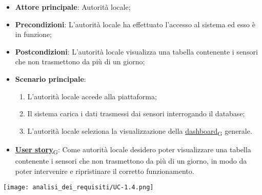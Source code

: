 \begin{itemize}
	\item \textbf{Attore principale}: Autorità locale;
	\item \textbf{Precondizioni}: L'autorità locale ha effettuato l'accesso al sistema ed esso è in funzione;
	\item \textbf{Postcondizioni}: L'autorità locale visualizza una tabella contenente i sensori che non trasmettono da più di un giorno;
	\item \textbf{Scenario principale}:
	      \begin{enumerate}
		      \item L'autorità locale accede alla piattaforma;
		      \item Il sistema carica i dati trasmessi dai sensori interrogando il database;
		      \item L'autorità locale seleziona la visualizzazione della \href{https://7last.github.io/docs/rtb/documentazione-interna/glossario\#dashboard}{dashboard\textsubscript{G}} generale.
	      \end{enumerate}
	\item \href{https://7last.github.io/docs/rtb/documentazione-interna/glossario\#user-story}{\textbf{User story}\textsubscript{G}}:
	      Come autorità locale desidero poter visualizzare una tabella contenente i sensori che non trasmettono da più di un giorno, in modo da poter intervenire e ripristinare il corretto funzionamento.
\end{itemize}
\begin{center}
	\texttt{[image: analisi\_dei\_requisiti/UC-1.4.png]}
\end{center}

